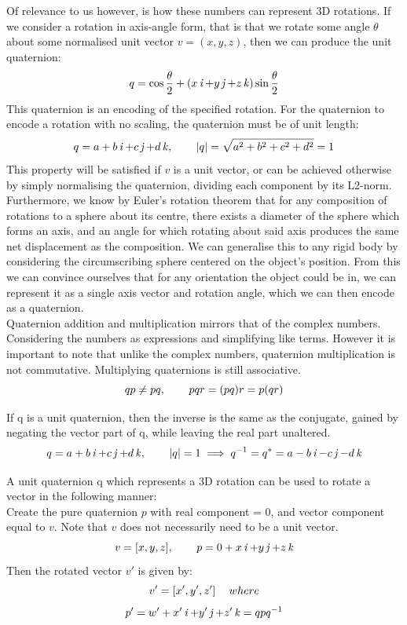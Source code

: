 Of relevance to us however, is how these numbers can represent 3D rotations. If we consider a rotation in axis-angle form, that is that we rotate some angle $\theta$ about some normalised unit vector $v = (x,y,z)$, then we can produce the unit quaternion:
$$q = \cos{\frac{\theta}{2}} + (x\operatorname{\mathit{i}} + y\operatorname{\mathit{j}} + z\operatorname{\mathit{k}}) \sin{\frac{\theta}{2}}$$
This quaternion is an encoding of the specified rotation. For the quaternion to encode a rotation with no scaling, the quaternion must be of unit length:
$$q = a + b\operatorname{\mathit{i}} + c\operatorname{\mathit{j}} + d\operatorname{\mathit{k}}, \operatorname{\operatorname{\: \: \: \:} \operatorname{\: \: \: \:}} |q| = \sqrt{a^2 + b^2 + c^2 + d^2} = 1$$
This property will be satisfied if $v$ is a unit vector, or can be achieved otherwise by simply normalising the quaternion, dividing each component by its L2-norm.\\

Furthermore, we know by Euler's rotation theorem \cite{euler-theorem} that for any composition of rotations to a sphere about its centre, there exists a diameter of the sphere which forms an axis, and an angle for which rotating about said axis produces the same net displacement as the composition. We can generalise this to any rigid body by considering the circumscribing sphere centered on the object's position. From this we can convince ourselves that for any orientation the object could be in, we can represent it as a single axis vector and rotation angle, which we can then encode as a quaternion.\\

Quaternion addition and multiplication mirrors that of the complex numbers. Considering the numbers as expressions and simplifying like terms. However it is important to note that unlike the complex numbers, quaternion multiplication is not commutative. Multiplying quaternions is still associative.
$$qp \neq pq, \operatorname{\operatorname{\: \: \: \:} \operatorname{\: \: \: \:}} pqr = (pq)r = p(qr)$$

If q is a unit quaternion, then the inverse is the same as the conjugate, gained by negating the vector part of q, while leaving the real part unaltered.
$$ q = a + b\operatorname{\mathit{i}} + c\operatorname{\mathit{j}} + d\operatorname{\mathit{k}}, \operatorname{\operatorname{\: \: \: \:} \operatorname{\: \: \: \:}} |q| = 1 \implies q^{-1} = q^* = a - b\operatorname{\mathit{i}} - c\operatorname{\mathit{j}} - d\operatorname{\mathit{k}}$$

A unit quaternion q which represents a 3D rotation can be used to rotate a vector in the following manner:\\
Create the pure quaternion $p$ with real component = $0$, and vector component equal to $v$. Note that $v$ does not necessarily need to be a unit vector.
$$v = [x,y,z], \operatorname{\operatorname{\: \: \: \:} \operatorname{\: \: \: \:}} p = 0 + x\operatorname{\mathit{i}} + y\operatorname{\mathit{j}} + z\operatorname{\mathit{k}} $$
Then the rotated vector $v'$ is given by:
$$v' = [x', y', z'] \operatorname{\: \: \: \:} where$$
$$p' = w' + x'\operatorname{\mathit{i}} + y'\operatorname{\mathit{j}} + z'\operatorname{\mathit{k}} = qpq^{-1}$$

